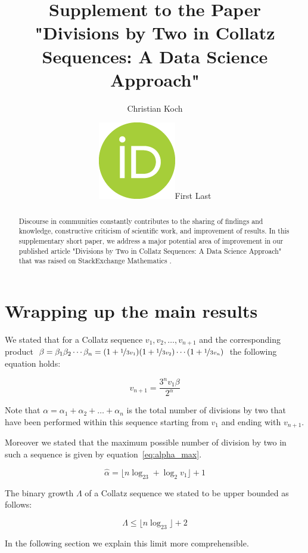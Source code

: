 \documentclass[12pt]{amsart}
\title[Supplement to the Paper Divisions by Two]{Supplement to the Paper "Divisions by Two in Collatz Sequences: A Data Science Approach"}
\author[C.\ Koch]{Christian Koch}
\author[F.\ Last1]{\href{https://orcid.org/0000-0000-0000-0000}{\includegraphics[scale=0.06]{orcid.png}}\hspace{1mm}First Last}
\theoremstyle{definition}
\begin{document}
	
\begingroup
\let\MakeUppercase\relax
\maketitle
\endgroup

\begin{abstract}
Discourse in communities constantly contributes to the sharing of findings and knowledge, constructive criticism of scientific work, and improvement of results. In this supplementary short paper, we address a major potential area of improvement in our published article "Divisions by Two in Collatz Sequences: A Data Science Approach" \cite{Koch_2020} that was raised on StackExchange Mathematics \cite{Collag3n_2020}.
\end{abstract}

\newpage
\section{Wrapping up the main results}
\label{wrap_up}
We stated that for a Collatz sequence $v_1,v_2,\ldots,v_{n+1}$ and the corresponding product $\beta=\beta_1\beta_2\cdots\beta_n=(1+\nicefrac{1}{3v_1})(1+\nicefrac{1}{3v_2})\cdots(1+\nicefrac{1}{3v_n})$ the following equation holds:

\begin{equation}
\label{eq:vn_plus_1}
v_{n+1}=\frac{3^nv_1\beta}{2^{\alpha}}
\end{equation}

Note that $\alpha=\alpha_1+\alpha_2+\ldots+\alpha_n$ is the total number of divisions by two that have been performed within this sequence starting from $v_1$ and ending with $v_{n+1}$.

Moreover we stated that the maximum possible number of division by two in such a sequence is given by equation~\ref{eq:alpha_max}.

\begin{equation}
\label{eq:alpha_max}
\hat\alpha=\lfloor n\log_23+\log_2v_1\rfloor+1
\end{equation}

The binary growth $\Lambda$ of a Collatz sequence we stated to be upper bounded as follows:

\begin{equation}
\label{eq:binary_growth}
\Lambda\le\lfloor n\log_23\rfloor+2
\end{equation}

In the following section we explain this limit more comprehensible.
\end{document}
